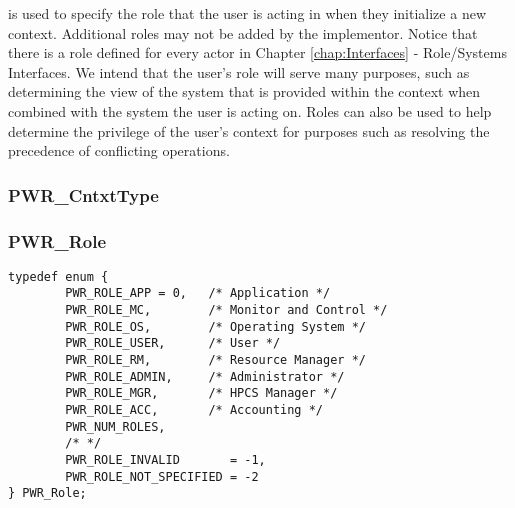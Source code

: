  is used to specify the role that the user is acting in when they initialize a new context.
Additional roles may not be added by the implementor.
Notice that there is a role defined for every actor in Chapter \ref{chap:Interfaces} - Role/Systems Interfaces.
We intend that the user's role will serve many purposes, such as determining the view of the system that is provided within the context when combined with the system the user is acting on. 
Roles can also be used to help determine the privilege of the user's context for purposes such as resolving the precedence of conflicting operations.


\subsubsection{PWR_CntxtType}\label{type:CntxtType}
\begin{typedefs}
	\pounddefineCNTXTDEFAULT
	\pounddefineCNTXTVENDOR
\end{typedefs}



\subsubsection{PWR_Role}\label{type:Role}
\begin{center}
\begin{minipage}{.95\linewidth}%
\begin{lstlisting}
typedef enum {
        PWR_ROLE_APP = 0,   /* Application */
        PWR_ROLE_MC,        /* Monitor and Control */
        PWR_ROLE_OS,        /* Operating System */
        PWR_ROLE_USER,      /* User */
        PWR_ROLE_RM,        /* Resource Manager */
        PWR_ROLE_ADMIN,     /* Administrator */
        PWR_ROLE_MGR,       /* HPCS Manager */
        PWR_ROLE_ACC,       /* Accounting */
        PWR_NUM_ROLES,
        /* */
        PWR_ROLE_INVALID       = -1,
        PWR_ROLE_NOT_SPECIFIED = -2
} PWR_Role;
\end{lstlisting}
\end{minipage}
\end{center}



